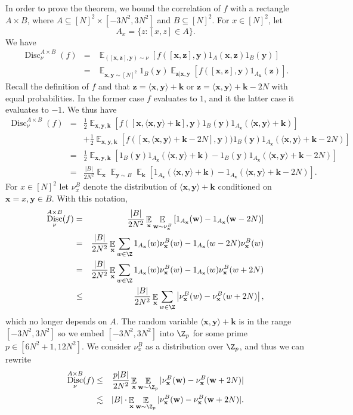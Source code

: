 \documentclass{toc}
\DeclareMathOperator{\Ex}{{\mathbb E}}
\DeclareMathOperator{\Disc}{Disc}
\newcommand{\x}{\mathbf{x}}
\newcommand{\y}{\mathbf{y}}
\newcommand{\w}{\mathbf{w}}
\newcommand{\z}{\mathbf{z}}
\newcommand{\Bk}{\mathbf{k}}   %
\newcommand{\ip}[1]{\langle #1 \rangle}
\begin{document}
In order to prove the theorem, we bound the correlation of $f$ with a rectangle $A \times B$, where  $A \subseteq [N]^2 \times  [- 3N^2, 3N^2]$ and $B \subseteq [N]^2$. For $x \in [N]^2$, let
$$A_x=\{z: [x,z] \in A\}.$$
We have
\begin{eqnarray*}
\Disc^{A \times B}_\nu(f) &=&   \Ex_{([\x,\z], \y) \sim \nu}  \left[ f([\x,\z],\y) 1_{A}(\x,\z)1_B(\y) \right] \\
	&=&  \Ex_{\x,\y \sim [N]^2} 1_B(\y)   \Ex_{\z|\x,\y}  \left[ f([\x,\z],\y) 1_{A_\x}(\z) \right].
 \end{eqnarray*}
 Recall the definition of $f$ and that $\z=\ip{\x,\y}+\Bk$ or $\z=\ip{\x,\y}+\Bk-2N$ with equal probabilities. In the former
 case $f$ evaluates to $1$, and it the latter case it evaluates to $-1$.
 We thus have
 \begin{eqnarray*}
\Disc^{A \times B}_\nu(f) &=&   \frac{1}{2} \Ex_{\x,\y,\Bk } \left[   f([\x,\ip{\x,\y}+\Bk],\y)  1_B(\y) 1_{A_\x}(\ip{\x,\y}+\Bk) \right] \\
 &&   +  \frac{1}{2} \Ex_{\x,\y,\Bk } \left[    f([\x,\ip{\x,\y}+\Bk-2N],\y) )  1_B(\y) 1_{A_\x}(\ip{\x,\y}+\Bk-2N)\right] \\
 &=&  \frac{1}{2} \Ex_{\x,\y,\Bk}  \left[ 1_B(\y)  1_{A_\x}(\ip{\x,\y}+\Bk)-  1_B(\y)  1_{A_\x}(\ip{\x,\y}+\Bk-2N) \right] \\
	 &=& \frac{|B|}{2N^2} \Ex_\x \Ex_{\y \sim B}\Ex_\Bk \left[ 1_{A_\x}(\ip{\x,\y}+\Bk)-     1_{A_\x}(\ip{\x,\y}+\Bk-2N) \right].
\end{eqnarray*}
For $x \in [N]^2$ let $\nu^B_x$ denote the distribution of $\ip{\x,\y}+\Bk$ conditioned on $\x = x, \y \in B$.  With this notation,
%
\begin{eqnarray*}
 \Disc^{A \times B}_\nu(f) &=& \frac{|B|}{2N^2} \Ex_\x \Ex_{\w \sim \nu^B_\x} \left[  1_{A_\x}(\w)- 1_{A_\x}(\w-2N) \right] \\
  &= & \frac{|B|}{2N^2} \Ex_\x  \sum_{w \in \Z} 1_{A_\x}(w) \nu_{\x}^B(w) - 1_{A_\x}(w-2N)   \nu_{\x}^B(w)  \\
  &=&  \frac{|B|}{2N^2} \Ex_\x  \sum_{w \in \Z} 1_{A_\x}(w) \nu_{\x}^B(w) - 1_{A_\x}(w)  \nu_{\x}^B(w+2N) \\
  & \le &  \frac{|B|}{2N^2}   \Ex_\x  \sum_{w \in \Z} \left|\nu_{\x}^B(w) -\nu_{\x}^B(w+2N)\right|,
  \end{eqnarray*}
	which no longer depends on $A$.  The random variable $\ip{\x,\y}+\Bk$ is in the range $[-3N^2,3N^2]$ so we embed $[-3N^2,3N^2]$ into $\Z_p$ for some prime $ p\in [6N^2+1,12N^2]$. We consider $\nu_x^B$ as a distribution over $\Z_p$, and thus we can rewrite
\begin{eqnarray*}
\label{eq:DiscSimplified}
	\Disc^{A \times B}_\nu(f) &\leq&  \frac{p |B| }{2N^2}   \Ex_\x  \Ex_{\w \sim \Z_p} |\nu_{\x}^B(\w) -\nu_{\x}^B(\w+2N)| \\
	&\lesssim& |B|\cdot \Ex_\x  \Ex_{\w \sim \Z_p} |\nu_{\x}^B(\w) -\nu_{\x}^B(\w+2N)|.
 \end{eqnarray*}
\end{document}
